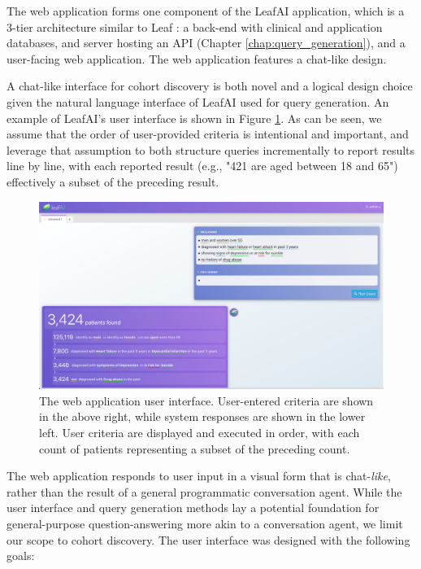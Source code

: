 \documentclass[../main.tex]{subfiles}
\begin{document}
The web application forms one component of the LeafAI application, which is a 3-tier architecture similar to Leaf \cite{dobbins2019leaf}: a back-end with clinical and application databases, and server hosting an API (Chapter \ref{chap:query_generation}), and a user-facing web application. The web application features a chat-like design.

A chat-like interface for cohort discovery is both novel and a logical design choice given the natural language interface of LeafAI used for query generation. An example of LeafAI's user interface is shown in Figure \ref{fig_leafai_demo}. As can be seen, we assume that the order of user-provided criteria is intentional and important, and leverage that assumption to both structure queries incrementally to report results line by line, with each reported result (e.g., "421 are aged between 18 and 65") effectively a subset of the preceding result.

\begin{figure}[h!]
  \includegraphics[scale=0.28]{Figures/8_web_application/leafai_demo.png}  
  \caption{The web application user interface. User-entered criteria are shown in the above right, while system responses are shown in the lower left. User criteria are displayed and executed in order, with each count of patients representing a subset of the preceding count.}
\label{fig_leafai_demo}
\end{figure}

The web application responds to user input in a visual form that is chat-\textit{like}, rather than the result of a general programmatic conversation agent. While the user interface and query generation methods lay a potential foundation for general-purpose question-answering more akin to a conversation agent, we limit our scope to cohort discovery. The user interface was designed with the following goals:
\end{document}
